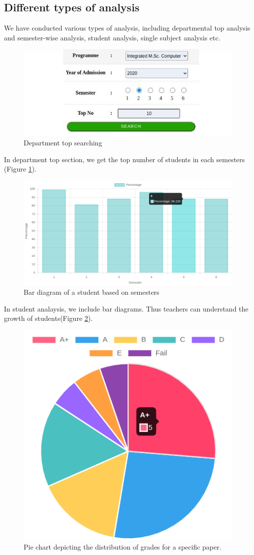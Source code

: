 \documentclass{nascproject}
\begin{document}
\subsection{Different types of analysis}
We have conducted various types of analysis, including departmental top analysis and semester-wise analysis, student analysis, single subject analysis etc.
\begin{figure}
	\centering
	\includegraphics[width=1\linewidth]{dept_top.jpeg}
	\caption{Department top searching}
	\label{dept_top}
\end{figure}
In department top section, we get the top number of students in each semesters (Figure \ref{dept_top}).
\begin{figure}
	\centering
	\includegraphics[width=1\linewidth]{bar_diagram.png}
	\caption{Bar diagram of a student based on semesters}
	\label{graph}
\end{figure}
In student analaysis, we include bar diagrams. Thus teachers can understand the growth of students(Figure \ref{graph}).
\begin{figure}
	\centering
	\includegraphics[width=0.5\linewidth]{pie1.png}
	\caption{Pie chart depicting the distribution of grades for a specific paper.}
	\label{pie}
\end{figure}
\end{document}
